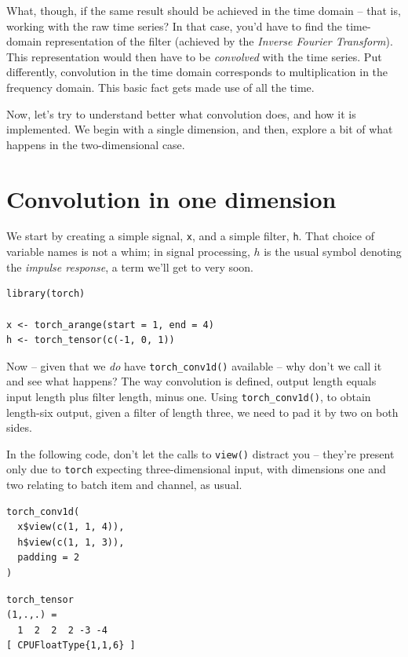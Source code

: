 \documentclass[
  letterpaper,
]{krantz}
\begin{document}
What, though, if the same result should be achieved in the time domain
-- that is, working with the raw time series? In that case, you'd have
to find the time-domain representation of the filter (achieved by the
\emph{Inverse Fourier Transform}). This representation would then have
to be \emph{convolved} with the time series. Put differently,
convolution in the time domain corresponds to multiplication in the
frequency domain. This basic fact gets made use of all the time.

Now, let's try to understand better what convolution does, and how it is
implemented. We begin with a single dimension, and then, explore a bit
of what happens in the two-dimensional case.

\hypertarget{convolution-in-one-dimension}{%
\section{Convolution in one
dimension}\label{convolution-in-one-dimension}}

We start by creating a simple signal, \texttt{x}, and a simple filter,
\texttt{h}. That choice of variable names is not a whim; in signal
processing, \(h\) is the usual symbol denoting the \emph{impulse
response}, a term we'll get to very soon.

\begin{verbatim}
library(torch)

x <- torch_arange(start = 1, end = 4) 
h <- torch_tensor(c(-1, 0, 1))
\end{verbatim}

Now -- given that we \emph{do} have \texttt{torch\_conv1d()} available
-- why don't we call it and see what happens? The way convolution is
defined, output length equals input length plus filter length, minus
one. Using \texttt{torch\_conv1d()}, to obtain length-six output, given
a filter of length three, we need to pad it by two on both sides.

In the following code, don't let the calls to \texttt{view()} distract
you -- they're present only due to \texttt{torch} expecting
three-dimensional input, with dimensions one and two relating to batch
item and channel, as usual.

\begin{verbatim}
torch_conv1d(
  x$view(c(1, 1, 4)),
  h$view(c(1, 1, 3)),
  padding = 2
)
\end{verbatim}

\begin{verbatim}
torch_tensor
(1,.,.) = 
  1  2  2  2 -3 -4
[ CPUFloatType{1,1,6} ]
\end{verbatim}
\end{document}
